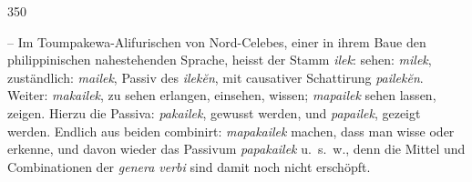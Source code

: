 \begin{table}[H]
\centering
{}
\end{table}

{\textbar}{\textbar}350{\textbar}{\textbar}\label{sp.350}

\noindent {} – Im Toumpakewa-Alifurischen von Nord-Celebes, einer in ihrem Baue den philippinischen nahestehenden Sprache, heisst der Stamm \textit{ilek}: sehen:  \textit{milek}, zuständlich: \textit{mailek}, Passiv des  \textit{ilekĕn}, mit causativer Schattirung \textit{pailekĕn}. Weiter: \textit{makailek}, zu sehen erlangen, einsehen, wissen; \textit{mapailek} sehen lassen, zeigen. Hierzu die Passiva: \textit{pakailek}, gewusst werden, und \textit{papailek}, gezeigt werden. Endlich aus beiden combinirt: \textit{mapakailek} machen, dass man wisse oder erkenne, und davon wieder das Passivum \textit{papakailek} u.~s.~w., denn die Mittel und Combinationen der \textit{genera verbi} sind damit noch nicht erschöpft.

